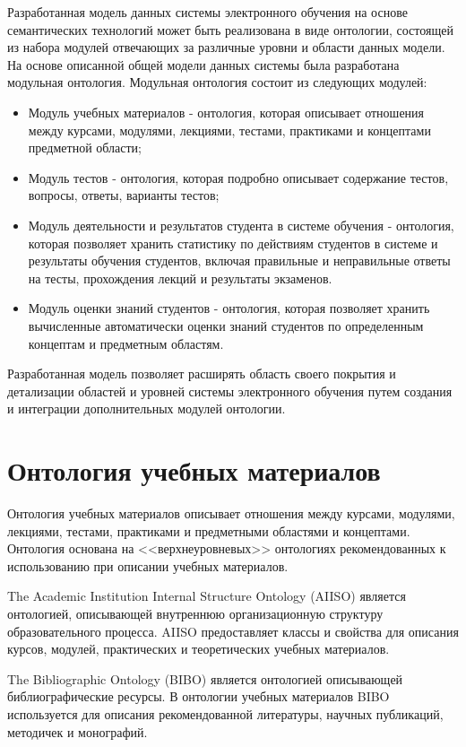 Разработанная модель данных системы электронного обучения на основе семантических технологий может быть реализована в виде онтологии, состоящей из набора модулей отвечающих за различные уровни и области данных модели. На основе описанной общей модели данных системы была разработана модульная онтология. Модульная онтология состоит из следующих модулей:

\begin{itemize}
\item Модуль учебных материалов - онтология, которая описывает отношения между курсами, модулями, лекциями, тестами, практиками и концептами предметной области;
\item Модуль тестов - онтология, которая подробно описывает содержание тестов, вопросы, ответы, варианты тестов;
\item Модуль деятельности и результатов студента в системе обучения - онтология, которая позволяет хранить статистику по действиям студентов в системе и результаты обучения студентов, включая правильные и неправильные ответы на тесты, прохождения лекций и результаты экзаменов.
\item Модуль оценки знаний студентов - онтология, которая позволяет хранить вычисленные автоматически оценки знаний студентов по определенным концептам и предметным областям.
\end{itemize} 

Разработанная модель позволяет расширять область своего покрытия и детализации областей и уровней системы электронного обучения путем создания и интеграции дополнительных модулей онтологии.



\section{Онтология учебных материалов} \label{sect2_2}

Онтология учебных материалов описывает отношения между курсами, модулями, лекциями, тестами, практиками и предметными областями и концептами. Онтология основана на  <<верхнеуровневых>> онтологиях рекомендованных к использованию при описании учебных материалов.

The Academic Institution Internal Structure Ontology (AIISO) является онтологией, описывающей внутреннюю организационную структуру образовательного процесса. AIISO предоставляет классы и свойства для описания курсов, модулей, практических и теоретических учебных материалов.

The Bibliographic Ontology (BIBO) является онтологией описывающей библиографические ресурсы. В онтологии учебных материалов BIBO используется для описания рекомендованной литературы, научных публикаций, методичек и монографий. 

